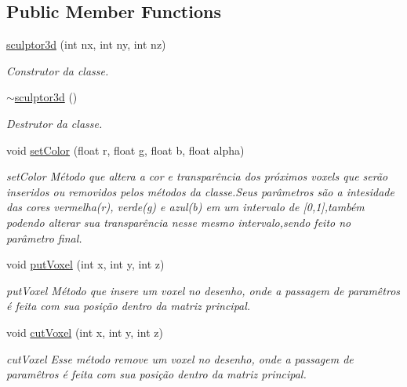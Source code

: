 \subsection*{Public Member Functions}
\begin{DoxyCompactItemize}
\item 
\mbox{\hyperlink{classsculptor3d_a36be08ef50a69161c1332f4a1cff226c}{sculptor3d}} (int nx, int ny, int nz)
\begin{DoxyCompactList}\small\item\em Construtor da classe. \end{DoxyCompactList}\item 
\mbox{\label{classsculptor3d_ac0aa5ebfa033c54aad6a8d995ecbede8}} 
\mbox{\hyperlink{classsculptor3d_ac0aa5ebfa033c54aad6a8d995ecbede8}{$\sim$sculptor3d}} ()
\begin{DoxyCompactList}\small\item\em Destrutor da classe. \end{DoxyCompactList}\item 
void \mbox{\hyperlink{classsculptor3d_aba9db4181e1087a09f1de6eee3d03705}{set\+Color}} (float r, float g, float b, float alpha)
\begin{DoxyCompactList}\small\item\em set\+Color Método que altera a cor e transparência dos próximos voxels que serão inseridos ou removidos pelos métodos da classe.\+Seus parâmetros são a intesidade das cores vermelha(r), verde(g) e azul(b) em um intervalo de \mbox{[}0,1\mbox{]},também podendo alterar sua transparência nesse mesmo intervalo,sendo feito no parâmetro final. \end{DoxyCompactList}\item 
void \mbox{\hyperlink{classsculptor3d_a15cb3ad622cf1b85f3c5811af1fe1ff3}{put\+Voxel}} (int x, int y, int z)
\begin{DoxyCompactList}\small\item\em put\+Voxel Método que insere um voxel no desenho, onde a passagem de paramêtros é feita com sua posição dentro da matriz principal. \end{DoxyCompactList}\item 
void \mbox{\hyperlink{classsculptor3d_a3bc32c45bd4de88a0316e709e63fb54f}{cut\+Voxel}} (int x, int y, int z)
\begin{DoxyCompactList}\small\item\em cut\+Voxel Esse método remove um voxel no desenho, onde a passagem de paramêtros é feita com sua posição dentro da matriz principal. \end{DoxyCompactList}\item 

\end{DoxyCompactItemize}
